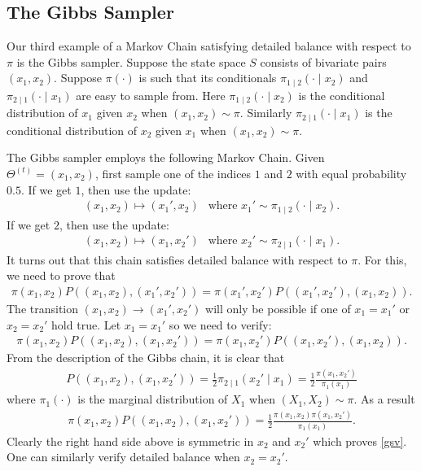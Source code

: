 \documentclass{scrartcl}
\begin{document}
\subsection{The Gibbs Sampler}

Our third example of a Markov Chain satisfying detailed balance with
respect to $\pi$ is the Gibbs sampler. Suppose the state space $S$
consists of bivariate pairs $(x_1, x_2)$. Suppose $\pi(\cdot)$ is such
that its conditionals $\pi_{1 \mid 2}(\cdot \mid x_2)$ and $\pi_{2
  \mid 1} (\cdot \mid x_1)$ are easy to sample from. Here $\pi_{1 \mid
2}(\cdot \mid x_2)$ is the conditional distribution of $x_1$ given
$x_2$ when $(x_1, x_2) \sim \pi$. Similarly $\pi_{2 \mid 1}(\cdot \mid
x_1)$ is the conditional distribution of $x_2$ given $x_1$ when
$(x_1, x_2) \sim \pi$.

The Gibbs sampler employs the following Markov Chain. Given
$\Theta^{(t)} = (x_1, x_2)$, first sample one of the indices $1$ and
$2$ with equal probability $0.5$. If we get $1$, then use the update:
\begin{align*}
  (x_1, x_2) \mapsto (x_1', x_2) ~~ \text{ where $x_1' \sim \pi_{1
  \mid 2}(\cdot
  \mid x_2)$}. 
\end{align*}
If we get $2$, then use the update:
\begin{align*}
  (x_1, x_2) \mapsto (x_1, x_2') ~~ \text{ where $x_2' \sim \pi_{2
  \mid 1}(\cdot
  \mid x_1)$}. 
\end{align*}
It turns out that this chain satisfies detailed balance with respect
to $\pi$. For this, we need to prove that
\begin{align*}
  \pi(x_1, x_2) P((x_1, x_2), (x_1', x_2')) =   \pi(x_1', x_2')
  P((x_1', x_2'), (x_1, x_2)). 
\end{align*}
The transition $(x_1, x_2) \rightarrow (x_1', x_2')$ will only be
possible if one of $x_1 = x_1'$ or $x_2 = x_2'$ hold true. Let $x_1 =
x_1'$ so we need to verify: 
\begin{align}\label{gsv}
  \pi(x_1, x_2) P((x_1, x_2), (x_1, x_2')) =   \pi(x_1, x_2')
  P((x_1, x_2'), (x_1, x_2)). 
\end{align}
From the description of the Gibbs chain, it is clear that
\begin{align*}
  P((x_1, x_2), (x_1, x_2')) = \frac{1}{2} \pi_{2 \mid 1}(x_2' \mid
  x_1) = \frac{1}{2} \frac{\pi(x_1, x_2')}{\pi_1(x_1)}
\end{align*}
where $\pi_1(\cdot)$ is the marginal  distribution of $X_1$ when
$(X_1, X_2) \sim \pi$. As a result
\begin{align*}
  \pi(x_1, x_2) P((x_1, x_2), (x_1, x_2')) = \frac{1}{2}
  \frac{\pi(x_1, x_2)\pi(x_1, x_2')}{\pi_1(x_1)}.  
\end{align*}
Clearly the right hand side above is symmetric in $x_2$ and $x_2'$
which proves \eqref{gsv}. One can similarly verify detailed balance
when $x_2 = x_2'$.
\end{document}
